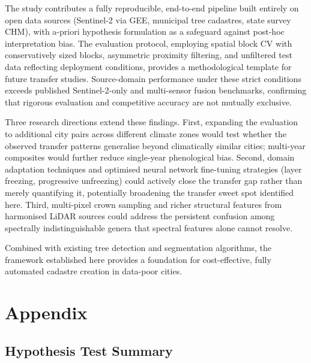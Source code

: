 \documentclass[11pt,a4paper]{scrartcl}
\begin{document}
The study contributes a fully reproducible, end-to-end pipeline built
entirely on open data sources (Sentinel-2 via GEE, municipal tree
cadastres, state survey CHM), with a-priori hypothesis formulation as a
safeguard against post-hoc interpretation bias. The evaluation protocol,
employing spatial block CV with conservatively sized blocks, asymmetric
proximity filtering, and unfiltered test data reflecting deployment
conditions, provides a methodological template for future transfer
studies. Source-domain performance under these strict conditions exceeds
published Sentinel-2-only and multi-sensor fusion benchmarks, confirming
that rigorous evaluation and competitive accuracy are not mutually
exclusive.

Three research directions extend these findings. First, expanding the
evaluation to additional city pairs across different climate zones would
test whether the observed transfer patterns generalise beyond
climatically similar cities; multi-year composites would further reduce
single-year phenological bias. Second, domain adaptation techniques and
optimised neural network fine-tuning strategies (layer freezing,
progressive unfreezing) could actively close the transfer gap rather
than merely quantifying it, potentially broadening the transfer sweet
spot identified here. Third, multi-pixel crown sampling and richer
structural features from harmonised LiDAR sources could address the
persistent confusion among spectrally indistinguishable genera that
spectral features alone cannot resolve.

Combined with existing tree detection and segmentation algorithms, the
framework established here provides a foundation for cost-effective,
fully automated cadastre creation in data-poor cities.

\FloatBarrier
\clearpage
\appendix

\section{Appendix}\label{appendix}

\subsection{Hypothesis Test Summary}\label{hypothesis-test-summary}
\end{document}
